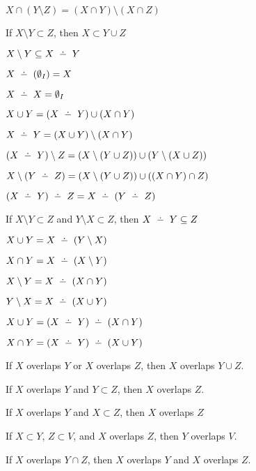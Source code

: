 \documentclass{article}
\begin{document}
\begin{thm}
\item\label{pboole:81} $X \cap (Y \setminus Z) = (X \cap Y) \setminus (X \cap Z)$
\item\label{pboole:82} If $X \setminus Y \subset Z$, then $X \subset Y \cup Z$
\item\label{pboole:83} $X \setminus Y \subset X \symdiff Y$
\item\label{pboole:84} $ X \symdiff (\EmptyMS I) = X$
\item\label{pboole:85} $X \symdiff X = \EmptyMS I$
\item\label{pboole:86} $X \cup Y = (X \symdiff Y) \cup (X \cap Y)$
\item\label{pboole:87} $X \symdiff Y = (X \cup Y) \setminus (X \cap Y)$
\item\label{pboole:88} $(X \symdiff Y) \setminus Z = (X \setminus (Y \cup Z)) \cup (Y \setminus (X \cup Z))$
\item\label{pboole:89} $X \setminus (Y \symdiff Z) = (X \setminus (Y \cup Z)) \cup ((X \cap Y) \cap Z)$
\item\label{pboole:90} $(X \symdiff Y) \symdiff Z = X \symdiff (Y \symdiff Z)$
\item\label{pboole:91} If $X \setminus Y \subset Z$ and $Y \setminus X \subset Z$, then $X \symdiff Y \subset Z$
\item\label{pboole:92} $X \cup Y = X \symdiff (Y \setminus X)$
\item\label{pboole:93} $X \cap Y = X \symdiff (X \setminus Y)$
\item\label{pboole:94} $X \setminus Y = X \symdiff (X \cap Y)$
\item\label{pboole:95} $Y \setminus X = X \symdiff (X \cup Y)$
\item\label{pboole:96} $X \cup Y = (X \symdiff Y) \symdiff (X \cap Y)$
\item\label{pboole:97} $X \cap Y = (X \symdiff Y) \symdiff (X \cup Y)$
\item\label{pboole:98} If $X$ overlaps $Y$ or $X$ overlaps $Z$, then $X$
  overlaps $Y\cup Z$.
\item\label{pboole:99} If $X$ overlaps $Y$ and $Y\subset Z$, then $X$
  overlaps $Z$.
\item\label{pboole:100} If $X$ overlaps $Y$ and $X\subset Z$, then $X$
  overlaps $Z$
\item\label{pboole:101} If $X\subset Y$, $Z\subset V$, and $X$ overlaps $Z$,
  then $Y$ overlaps $V$.
\item\label{pboole:102} If $X$ overlaps $Y\cap Z$, then $X$ overlaps $Y$
  and $X$ overlaps $Z$.

\end{thm}
\end{document}
